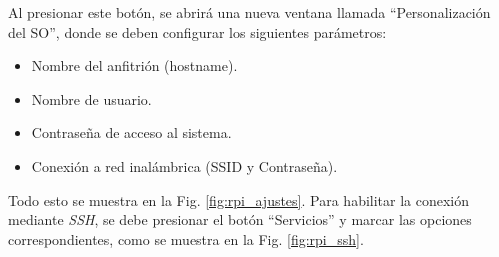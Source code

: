 \documentclass[12pt]{article}
\begin{document}
Al presionar este botón, se abrirá una nueva ventana llamada ``Personalización del SO'', donde se deben configurar los siguientes parámetros:

\begin{itemize}
    \item Nombre del anfitrión (hostname).
    \item Nombre de usuario.
    \item Contraseña de acceso al sistema.
    \item Conexión a red inalámbrica (SSID y Contraseña).
\end{itemize}

Todo esto se muestra en la Fig. \ref{fig:rpi_ajustes}. Para habilitar la conexión mediante \textit{SSH}, se debe presionar el botón ``Servicios'' y marcar las opciones correspondientes, como se muestra en la Fig. \ref{fig:rpi_ssh}.
\end{document}
